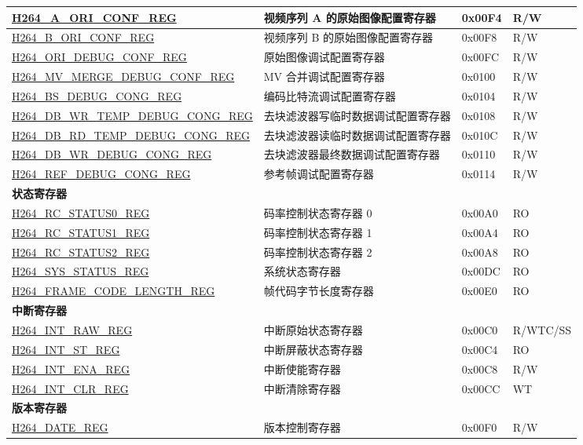 \begin{longtable}{ | p{7cm} | p{6.2cm} | p{1.2cm} | p{1cm} | }
\hyperref[regdesc:H264AORICONFREG]{H264\_A\_ORI\_CONF\_REG} & 视频序列 A 的原始图像配置寄存器 & 0x00F4 & R/W \\ \hline
\hyperref[regdesc:H264BORICONFREG]{H264\_B\_ORI\_CONF\_REG} & 视频序列 B 的原始图像配置寄存器 & 0x00F8 & R/W \\ \hline
\hyperref[regdesc:H264ORIDEBUGCONFREG]{H264\_ORI\_DEBUG\_CONF\_REG} & 原始图像调试配置寄存器 & 0x00FC & R/W \\ \hline
\hyperref[regdesc:H264MVMERGEDEBUGCONFREG]{H264\_MV\_MERGE\_DEBUG\_CONF\_REG} & MV 合并调试配置寄存器 & 0x0100 & R/W \\ \hline
\hyperref[regdesc:H264BSDEBUGCONGREG]{H264\_BS\_DEBUG\_CONG\_REG} & 编码比特流调试配置寄存器 & 0x0104 & R/W \\ \hline
\hyperref[regdesc:H264DBWRTEMPDEBUGCONGREG]{H264\_DB\_WR\_TEMP\_DEBUG\_CONG\_REG} & 去块滤波器写临时数据调试配置寄存器 & 0x0108 & R/W \\ \hline
\hyperref[regdesc:H264DBRDTEMPDEBUGCONGREG]{H264\_DB\_RD\_TEMP\_DEBUG\_CONG\_REG} & 去块滤波器读临时数据调试配置寄存器 & 0x010C & R/W \\ \hline
\hyperref[regdesc:H264DBWRDEBUGCONGREG]{H264\_DB\_WR\_DEBUG\_CONG\_REG} & 去块滤波器最终数据调试配置寄存器 & 0x0110 & R/W \\ \hline
\hyperref[regdesc:H264REFDEBUGCONGREG]{H264\_REF\_DEBUG\_CONG\_REG} & 参考帧调试配置寄存器 & 0x0114 & R/W \\ \hline
\multicolumn{4}{|l|}{\textbf{状态寄存器}} \\ \hline
\hyperref[regdesc:H264RCSTATUS0REG]{H264\_RC\_STATUS0\_REG} & 码率控制状态寄存器 0 & 0x00A0 & RO \\ \hline
\hyperref[regdesc:H264RCSTATUS1REG]{H264\_RC\_STATUS1\_REG} & 码率控制状态寄存器 1 & 0x00A4 & RO \\ \hline
\hyperref[regdesc:H264RCSTATUS2REG]{H264\_RC\_STATUS2\_REG} & 码率控制状态寄存器 2 & 0x00A8 & RO \\ \hline
\hyperref[regdesc:H264SYSSTATUSREG]{H264\_SYS\_STATUS\_REG} & 系统状态寄存器 & 0x00DC & RO \\ \hline
\hyperref[regdesc:H264FRAMECODELENGTHREG]{H264\_FRAME\_CODE\_LENGTH\_REG} & 帧代码字节长度寄存器 & 0x00E0 & RO \\ \hline
\multicolumn{4}{|l|}{\textbf{中断寄存器}} \\ \hline
\hyperref[regdesc:H264INTRAWREG]{H264\_INT\_RAW\_REG} & 中断原始状态寄存器 & 0x00C0 & R/WTC/SS \\ \hline
\hyperref[regdesc:H264INTSTREG]{H264\_INT\_ST\_REG} & 中断屏蔽状态寄存器 & 0x00C4 & RO \\ \hline
\hyperref[regdesc:H264INTENAREG]{H264\_INT\_ENA\_REG} & 中断使能寄存器 & 0x00C8 & R/W \\ \hline
\hyperref[regdesc:H264INTCLRREG]{H264\_INT\_CLR\_REG} & 中断清除寄存器 & 0x00CC & WT \\ \hline
\multicolumn{4}{|l|}{\textbf{版本寄存器}} \\ \hline
\hyperref[regdesc:H264DATEREG]{H264\_DATE\_REG} & 版本控制寄存器 & 0x00F0 & R/W \\ \hline
\end{longtable}
